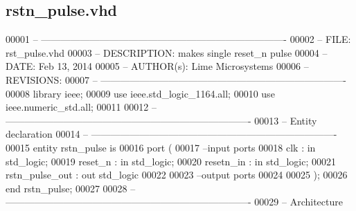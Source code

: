 \subsection{rstn\+\_\+pulse.\+vhd}
\label{rstn__pulse_8vhd_source}

\begin{DoxyCode}
00001 \textcolor{keyword}{-- ---------------------------------------------------------------------------- }
00002 \textcolor{keyword}{-- FILE:    rst\_pulse.vhd}
00003 \textcolor{keyword}{-- DESCRIPTION: makes single reset\_n pulse }
00004 \textcolor{keyword}{-- DATE:    Feb 13, 2014}
00005 \textcolor{keyword}{-- AUTHOR(s):   Lime Microsystems}
00006 \textcolor{keyword}{-- REVISIONS:}
00007 \textcolor{keyword}{-- ---------------------------------------------------------------------------- }
00008 \textcolor{vhdlkeyword}{library }\textcolor{keywordflow}{ieee};
00009 \textcolor{vhdlkeyword}{use }ieee.std\_logic\_1164.\textcolor{keywordflow}{all};
00010 \textcolor{vhdlkeyword}{use }ieee.numeric\_std.\textcolor{keywordflow}{all};
00011 
00012 \textcolor{keyword}{-- ----------------------------------------------------------------------------}
00013 \textcolor{keyword}{-- Entity declaration}
00014 \textcolor{keyword}{-- ----------------------------------------------------------------------------}
00015 \textcolor{keywordflow}{entity }rstn_pulse \textcolor{keywordflow}{is}
00016   \textcolor{keywordflow}{port} \textcolor{vhdlchar}{(}
00017 \textcolor{keyword}{        --input ports }
00018         \textcolor{vhdlchar}{clk}             \textcolor{vhdlchar}{:} \textcolor{keywordflow}{in} \textcolor{comment}{std\_logic};
00019           \textcolor{vhdlchar}{reset_n}           \textcolor{vhdlchar}{:} \textcolor{keywordflow}{in} \textcolor{comment}{std\_logic};
00020         \textcolor{vhdlchar}{resetn_in}           \textcolor{vhdlchar}{:} \textcolor{keywordflow}{in} \textcolor{comment}{std\_logic};
00021           \textcolor{vhdlchar}{rstn_pulse_out}    \textcolor{vhdlchar}{:} \textcolor{keywordflow}{out} \textcolor{comment}{std\_logic}
00022 
00023 \textcolor{keyword}{        --output ports }
00024         
00025         \textcolor{vhdlchar}{)};
00026 \textcolor{keywordflow}{end} \textcolor{vhdlchar}{rstn\_pulse};
00027 
00028 \textcolor{keyword}{-- ----------------------------------------------------------------------------}
00029 \textcolor{keyword}{-- Architecture}

\end{DoxyCode}
